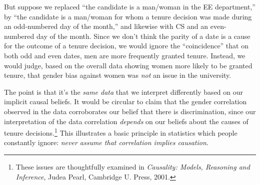 But suppose we replaced ``the candidate is a man/woman in the EE
department,'' by ``the candidate is a man/woman for whom a tenure
decision was made during an odd-numbered day of the month,'' and
likewise with CS and an even-numbered day of the month.  Since we
don't think the parity of a date is a cause for the outcome of a
tenure decision, we would ignore the ``coincidence'' that on both odd
and even dates, men are more frequently granted tenure.  Instead, we
would judge, based on the overall data showing women more likely to be
granted tenure, that gender bias against women was \emph{not} an issue
in the university.

The point is that it's the \emph{same data} that we interpret
differently based on our implicit causal beliefs.  It would be
circular to claim that the gender correlation observed in the data
corroborates our belief that there is discrimination, since our
interpretation of the data correlation \emph{depends} on our beliefs
about the causes of tenure decisions.\footnote{These issues are
  thoughtfully examined in \emph{Causality: Models, Reasoning and
    Inference}, Judea Pearl, Cambridge U. Press, 2001.}  This
illustrates a basic principle in statistics which people constantly
ignore: \emph{never assume that correlation implies causation}.


\begin{problems}
\practiceproblems
{}

\classproblems
{}

\homeworkproblems
{}

\examproblems
{}

\end{problems}


